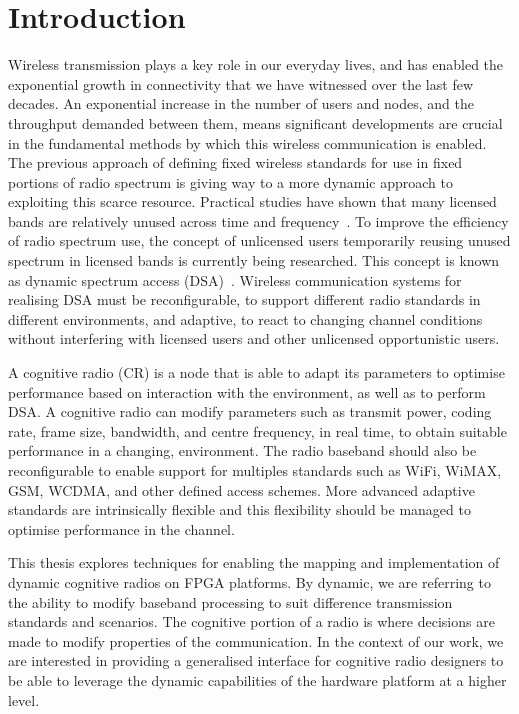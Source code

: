 \chapter{Introduction}
\label{chap:introduction}

Wireless transmission plays a key role in our everyday lives, and has enabled the exponential growth in connectivity that we have witnessed over the last few decades.
An exponential increase in the number of users and nodes, and the throughput demanded between them, means significant developments are crucial in the fundamental methods by which this wireless communication is enabled.
The previous approach of defining fixed wireless standards for use in fixed portions of radio spectrum is giving way to a more dynamic approach to exploiting this scarce resource.
Practical studies have shown that many licensed bands are relatively unused across time and frequency~\cite{FCC2002}.
To improve the efficiency of radio spectrum use, the concept of unlicensed users temporarily reusing unused spectrum in licensed bands is currently being researched.
This concept is known as dynamic spectrum access (DSA)~\cite{Minden}.
Wireless communication systems for realising DSA must be reconfigurable, to support different radio standards in different environments, and adaptive, to react to changing channel conditions without interfering with licensed users and other unlicensed opportunistic users.

A cognitive radio (CR) is a node that is able to adapt its parameters to optimise performance based on interaction with the environment, as well as to perform DSA.
A cognitive radio can modify parameters such as transmit power, coding rate, frame size, bandwidth, and centre frequency, in real time, to obtain suitable performance in a changing, environment.
The radio baseband should also be reconfigurable to enable support for multiples standards such as WiFi, WiMAX, GSM, WCDMA, and other defined access schemes.
More advanced adaptive standards are intrinsically flexible and this flexibility should be managed to optimise performance in the channel.

This thesis explores techniques for enabling the mapping and implementation of dynamic cognitive radios on FPGA platforms.
By dynamic, we are referring to the ability to modify baseband processing to suit difference transmission standards and scenarios.
The cognitive portion of a radio is where decisions are made to modify properties of the communication.
In the context of our work, we are interested in providing a generalised interface for cognitive radio designers to be able to leverage the dynamic capabilities of the hardware platform at a higher level.

